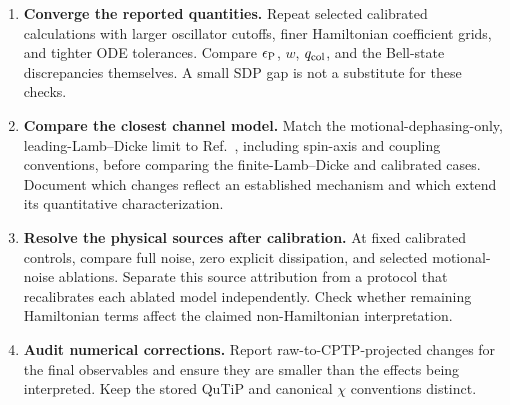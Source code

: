\documentclass[a4paper,11pt]{article}
\begin{document}
\begin{enumerate}
\item \textbf{Converge the reported quantities.}
Repeat selected calibrated calculations with larger oscillator
cutoffs, finer Hamiltonian coefficient grids, and tighter ODE
tolerances. Compare $\epsilon_{\rm P}$, $w$, $q_{\rm col}$, and
the Bell-state discrepancies themselves. A small SDP gap is not
a substitute for these checks.
\item \textbf{Compare the closest channel model.}
Match the motional-dephasing-only, leading-Lamb--Dicke limit to
Ref.~\cite{Ma2025}, including spin-axis and coupling conventions,
before comparing the finite-Lamb--Dicke and calibrated cases.
Document which changes reflect an established mechanism and which
extend its quantitative characterization.
\item \textbf{Resolve the physical sources after calibration.}
At fixed calibrated controls, compare full noise, zero explicit
dissipation, and selected motional-noise ablations. Separate this
source attribution from a protocol that recalibrates each ablated
model independently. Check whether remaining Hamiltonian terms
affect the claimed non-Hamiltonian interpretation.
\item \textbf{Audit numerical corrections.}
Report raw-to-CPTP-projected changes for the final observables
and ensure they are smaller than the effects being interpreted.
Keep the stored QuTiP and canonical $\chi$ conventions distinct.
\end{enumerate}
\end{document}
